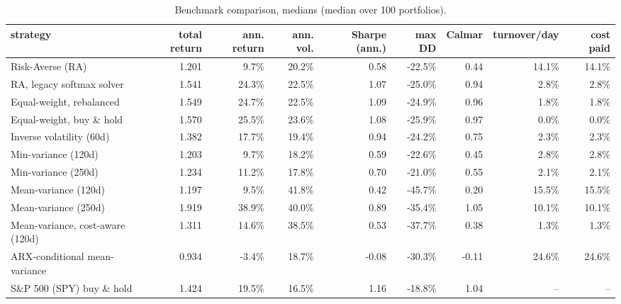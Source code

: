 \begin{table}[ht!]
\centering
\footnotesize
\setlength{\tabcolsep}{4pt}
\begin{tabular}{lrrrrrrrr}
\hline
strategy & total return & ann. return & ann. vol. & Sharpe (ann.) & max DD & Calmar & turnover/day & cost paid \\
\hline
Risk-Averse (RA) & 1.201 & 9.7\% & 20.2\% & 0.58 & -22.5\% & 0.44 & 14.1\% & 14.1\% \\
RA, legacy softmax solver & 1.541 & 24.3\% & 22.5\% & 1.07 & -25.0\% & 0.94 & 2.8\% & 2.8\% \\
Equal-weight, rebalanced & 1.549 & 24.7\% & 22.5\% & 1.09 & -24.9\% & 0.96 & 1.8\% & 1.8\% \\
Equal-weight, buy \& hold & 1.570 & 25.5\% & 23.6\% & 1.08 & -25.9\% & 0.97 & 0.0\% & 0.0\% \\
Inverse volatility (60d) & 1.382 & 17.7\% & 19.4\% & 0.94 & -24.2\% & 0.75 & 2.3\% & 2.3\% \\
Min-variance (120d) & 1.203 & 9.7\% & 18.2\% & 0.59 & -22.6\% & 0.45 & 2.8\% & 2.8\% \\
Min-variance (250d) & 1.234 & 11.2\% & 17.8\% & 0.70 & -21.0\% & 0.55 & 2.1\% & 2.1\% \\
Mean-variance (120d) & 1.197 & 9.5\% & 41.8\% & 0.42 & -45.7\% & 0.20 & 15.5\% & 15.5\% \\
Mean-variance (250d) & 1.919 & 38.9\% & 40.0\% & 0.89 & -35.4\% & 1.05 & 10.1\% & 10.1\% \\
Mean-variance, cost-aware (120d) & 1.311 & 14.6\% & 38.5\% & 0.53 & -37.7\% & 0.38 & 1.3\% & 1.3\% \\
ARX-conditional mean-variance & 0.934 & -3.4\% & 18.7\% & -0.08 & -30.3\% & -0.11 & 24.6\% & 24.6\% \\
S\&P 500 (SPY) buy \& hold & 1.424 & 19.5\% & 16.5\% & 1.16 & -18.8\% & 1.04 & -- & -- \\
\hline
\end{tabular}
\caption{Benchmark comparison, medians (median over 100 portfolios).}
\label{tab:bench_median_oos2026}
\end{table}
